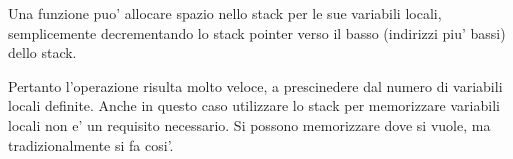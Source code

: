 
Una funzione puo' allocare spazio nello stack per le sue variabili locali, semplicemente decrementando
lo \gls{stack pointer} verso il basso (indirizzi piu' bassi) dello stack.


Pertanto l'operazione risulta molto veloce, a prescinedere dal numero di variabili locali definite.
Anche in questo caso utilizzare lo stack per memorizzare variabili locali non e' un requisito necessario.
Si possono memorizzare dove si vuole, ma tradizionalmente si fa cosi'.
